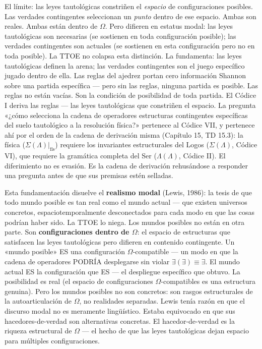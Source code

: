 \documentclass[10pt, openany, oneside]{book}
\begin{document}
El límite: las leyes tautológicas constriñen el \textit{espacio} de configuraciones posibles. Las verdades contingentes seleccionan un \textit{punto} dentro de ese espacio. Ambas son reales. Ambas están dentro de $\Omega$. Pero difieren en estatus modal: las leyes tautológicas son necesarias (se sostienen en toda configuración posible); las verdades contingentes son actuales (se sostienen en esta configuración pero no en toda posible). La TTOE no colapsa esta distinción. La fundamenta: las leyes tautológicas definen la arena; las verdades contingentes son el juego específico jugado dentro de ella. Las reglas del ajedrez portan cero información Shannon sobre una partida específica --- pero sin las reglas, ninguna partida es posible. Las reglas no están vacías. Son la condición de posibilidad de toda partida. El Códice I deriva las reglas --- las leyes tautológicas que constriñen el espacio. La pregunta «¿cómo selecciona la cadena de operadores estructuras contingentes específicas del suelo tautológico a la resolución física?» pertenece al Códice VII, y pertenece ahí por el orden de la cadena de derivación misma (Capítulo 15, TD 15.3): la física ($\Sigma(\Lambda)|_{\text{fís}}$) requiere los invariantes estructurales del Logos ($\Sigma(\Lambda)$, Códice VI), que requiere la gramática completa del Ser ($\Lambda(\Lambda)$, Códice II). El diferimiento no es evasión. Es la cadena de derivación rehusándose a responder una pregunta antes de que sus premisas estén selladas.

Esta fundamentación disuelve el \textbf{realismo modal} (Lewis, 1986): la tesis de que todo mundo posible es tan real como el mundo actual --- que existen universos concretos, espaciotemporalmente desconectados para cada modo en que las cosas podrían haber sido. La TTOE lo niega. Los mundos posibles no están en otra parte. Son \textbf{configuraciones dentro de $\Omega$}: el espacio de estructuras que satisfacen las leyes tautológicas pero difieren en contenido contingente. Un «mundo posible» ES una configuración $\Omega$-compatible --- un modo en que la cadena de operadores PODRÍA desplegarse sin violar $\exists(\exists) \equiv \exists$. El mundo actual ES la configuración que ES --- el despliegue específico que obtuvo. La posibilidad es real (el espacio de configuraciones $\Omega$-compatibles es una estructura genuina). Pero los mundos posibles no son concretos: son rasgos estructurales de la autoarticulación de $\Omega$, no realidades separadas. Lewis tenía razón en que el discurso modal no es meramente lingüístico. Estaba equivocado en que sus hacedores-de-verdad son alternativas concretas. El hacedor-de-verdad es la riqueza estructural de $\Omega$ --- el hecho de que las leyes tautológicas dejan espacio para múltiples configuraciones.
\end{document}
